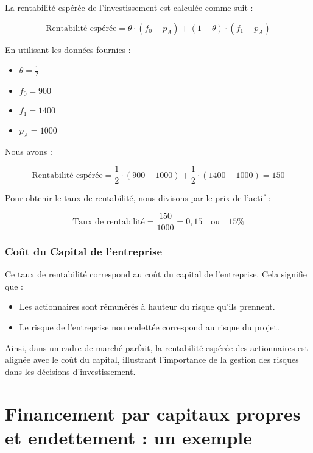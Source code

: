 \documentclass[a4paper, 12pt]{report}
\begin{document}
La rentabilité espérée de l'investissement est calculée comme suit :

\[
\text{Rentabilité espérée} = \theta \cdot (f_0 - p_A) + (1 - \theta) \cdot (f_1 - p_A)
\]

En utilisant les données fournies :

\begin{itemize}
	\item \( \theta = \frac{1}{2} \)
	\item \( f_0 = 900 \)
	\item \( f_1 = 1400 \)
	\item \( p_A = 1000 \)
\end{itemize}

Nous avons :

\[
\text{Rentabilité espérée} = \frac{1}{2} \cdot (900 - 1000) + \frac{1}{2} \cdot (1400 - 1000) = 150
\]

Pour obtenir le taux de rentabilité, nous divisons par le prix de l'actif :

\[
\text{Taux de rentabilité} = \frac{150}{1000} = 0,15 \quad \text{ou} \quad 15\%
\]

\subsubsection{Coût du Capital de l'entreprise}
\noindent
Ce taux de rentabilité correspond au coût du capital de l'entreprise. Cela signifie que :

\begin{itemize}
	\item Les actionnaires sont rémunérés à hauteur du risque qu'ils prennent.
	\item Le risque de l'entreprise non endettée correspond au risque du projet.
\end{itemize}

Ainsi, dans un cadre de marché parfait, la rentabilité espérée des actionnaires est alignée avec le coût du capital, illustrant l'importance de la gestion des risques dans les décisions d'investissement.

\section{Financement par capitaux propres et endettement : un exemple}
\end{document}
